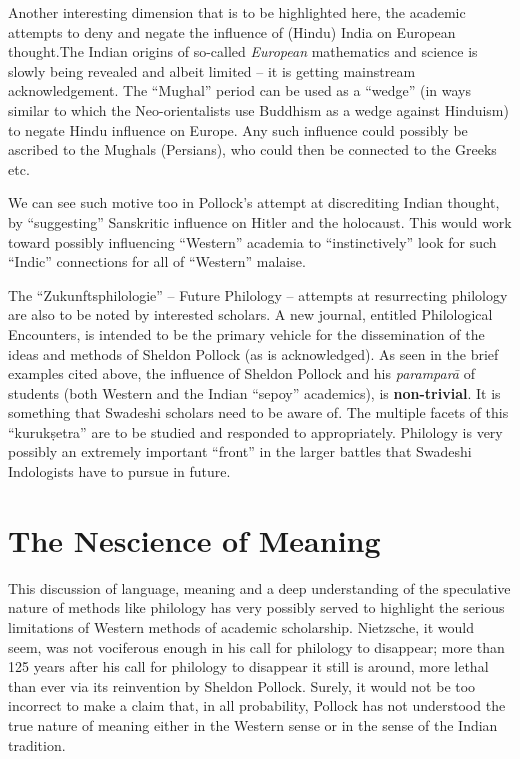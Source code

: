 Another interesting dimension that is to be highlighted here, the academic attempts to deny and negate the influence of (Hindu) India on European thought.The Indian origins of so-called \textit{European} mathematics and science is slowly being revealed and albeit limited – it is getting mainstream acknowledgement. The “Mughal” period can be used as a “wedge” (in ways similar to which the Neo-orientalists use Buddhism as a wedge against Hinduism) to negate Hindu influence on Europe. Any such influence could possibly be ascribed to the Mughals (Persians), who could then be connected to the Greeks etc.

We can see such motive too in Pollock’s attempt at discrediting Indian thought, by “suggesting” Sanskritic influence on Hitler and the holocaust. This would work toward possibly influencing “Western” academia to “instinctively” look for such “Indic” connections for all of “Western” malaise. 

The “Zukunftsphilologie” – Future Philology – attempts at resurrecting philology are also to be noted by interested scholars. A new journal, entitled Philological Encounters, is intended to be the primary vehicle for the dissemination of the ideas and methods of Sheldon Pollock (as is acknowledged). As seen in the brief examples cited above, the influence of Sheldon Pollock and his \textit{paramparā} of students (both Western and the Indian “sepoy” academics), is \textbf{non-trivial}. It is something that Swadeshi scholars need to be aware of. The multiple facets of this “kurukṣetra” are to be studied and responded to appropriately. Philology is very possibly an extremely important “front” in the larger battles that Swadeshi Indologists have to pursue in future.

\newpage

\section*{The Nescience of Meaning}

\vskip -5pt

This discussion of language, meaning and a deep understanding of the speculative nature of methods like philology has very possibly served to highlight the serious limitations of Western methods of academic scholarship. Nietzsche, it would seem, was not vociferous enough in his call for philology to disappear; more than 125 years after his call for philology to disappear it still is around, more lethal than ever via its reinvention by Sheldon Pollock. Surely, it would not be too incorrect to make a claim that, in all probability, Pollock has not understood the true nature of meaning either in the Western sense or in the sense of the Indian tradition.

